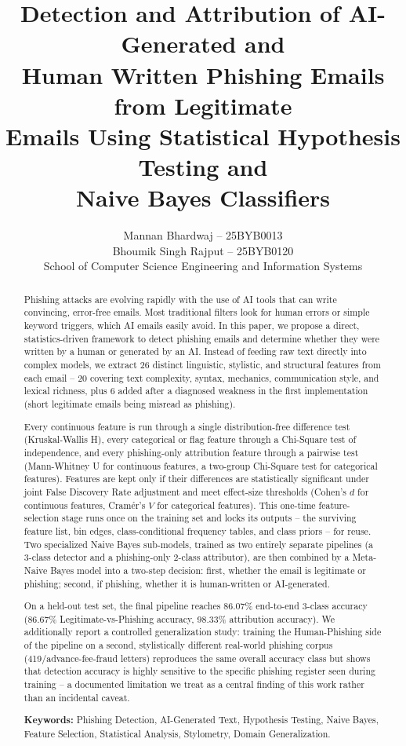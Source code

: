 \documentclass[11pt]{article}
\title{\textbf{Detection and Attribution of AI-Generated and\\
Human Written Phishing Emails from Legitimate\\
Emails Using Statistical Hypothesis Testing and\\
Naive Bayes Classifiers}}
\author{Mannan Bhardwaj -- 25BYB0013 \\ Bhoumik Singh Rajput -- 25BYB0120 \\[4pt]
School of Computer Science Engineering and Information Systems}
\date{}
\begin{document}
\maketitle

\begin{abstract}
\noindent Phishing attacks are evolving rapidly with the use of AI tools that can write convincing,
error-free emails. Most traditional filters look for human errors or simple keyword triggers,
which AI emails easily avoid. In this paper, we propose a direct, statistics-driven framework
to detect phishing emails and determine whether they were written by a human or generated
by an AI. Instead of feeding raw text directly into complex models, we extract 26 distinct
linguistic, stylistic, and structural features from each email -- 20 covering text complexity,
syntax, mechanics, communication style, and lexical richness, plus 6 added after a diagnosed
weakness in the first implementation (short legitimate emails being misread as phishing).

Every continuous feature is run through a single distribution-free difference test
(Kruskal-Wallis H), every categorical or flag feature through a Chi-Square test of independence,
and every phishing-only attribution feature through a pairwise test (Mann-Whitney U for
continuous features, a two-group Chi-Square test for categorical features). Features are kept
only if their differences are statistically significant under joint False Discovery Rate
adjustment and meet effect-size thresholds (Cohen's $d$ for continuous features, Cram\'er's $V$
for categorical features). This one-time feature-selection stage runs once on the training set
and locks its outputs -- the surviving feature list, bin edges, class-conditional frequency
tables, and class priors -- for reuse. Two specialized Naive Bayes sub-models, trained as two
entirely separate pipelines (a 3-class detector and a phishing-only 2-class attributor), are then
combined by a Meta-Naive Bayes model into a two-step decision: first, whether the email is
legitimate or phishing; second, if phishing, whether it is human-written or AI-generated.

On a held-out test set, the final pipeline reaches 86.07\% end-to-end 3-class accuracy
(86.67\% Legitimate-vs-Phishing accuracy, 98.33\% attribution accuracy). We additionally report
a controlled generalization study: training the Human-Phishing side of the pipeline on a second,
stylistically different real-world phishing corpus (419/advance-fee-fraud letters) reproduces the
same overall accuracy class but shows that detection accuracy is highly sensitive to the specific
phishing register seen during training -- a documented limitation we treat as a central finding
of this work rather than an incidental caveat.

\vspace{6pt}
\noindent\textbf{Keywords:} Phishing Detection, AI-Generated Text, Hypothesis Testing, Naive Bayes,
Feature Selection, Statistical Analysis, Stylometry, Domain Generalization.
\end{abstract}
\end{document}
